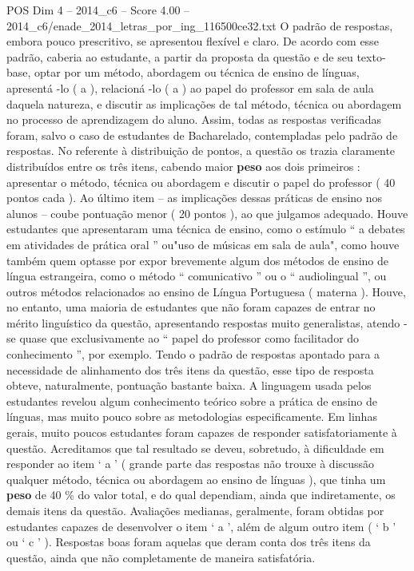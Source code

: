\begin{textsample}{POS Dim 4 – 2014\_c6 – Score 4.00 – 2014\_c6/enade\_2014\_letras\_por\_ing\_116500ce32.txt}
O padrão de respostas, embora pouco prescritivo, se apresentou flexível e claro.
De acordo com esse padrão, caberia ao estudante, a partir da proposta da questão e de seu texto-base, optar por um método, abordagem ou técnica de ensino de línguas, apresentá -lo ( a ), relacioná -lo ( a ) ao papel do professor em sala de aula daquela natureza, e discutir as implicações de tal método, técnica ou abordagem no processo de aprendizagem do aluno.
Assim, todas as respostas verificadas foram, salvo o caso de estudantes de Bacharelado, contempladas pelo padrão de respostas.
No referente à distribuição de pontos, a questão os trazia claramente distribuídos entre os três itens, cabendo maior \textbf{peso} aos dois primeiros : apresentar o método, técnica ou abordagem e discutir o papel do professor ( 40 pontos cada ).
Ao último item – as implicações dessas práticas de ensino nos alunos – coube pontuação menor ( 20 pontos ), ao que julgamos adequado.
Houve estudantes que apresentaram uma técnica de ensino, como o estímulo “ a debates em atividades de prática oral ” ou"uso de músicas em sala de aula", como houve também quem optasse por expor brevemente algum dos métodos de ensino de língua estrangeira, como o método “ comunicativo ” ou o “ audiolingual ”, ou outros métodos relacionados ao ensino de Língua Portuguesa ( materna ).
Houve, no entanto, uma maioria de estudantes que não foram capazes de entrar no mérito linguístico da questão, apresentando respostas muito generalistas, atendo -se quase que exclusivamente ao “ papel do professor como facilitador do conhecimento ”, por exemplo.
Tendo o padrão de respostas apontado para a necessidade de alinhamento dos três itens da questão, esse tipo de resposta obteve, naturalmente, pontuação bastante baixa.
A linguagem usada pelos estudantes revelou algum conhecimento teórico sobre a prática de ensino de línguas, mas muito pouco sobre as metodologias especificamente.
Em linhas gerais, muito poucos estudantes foram capazes de responder satisfatoriamente à questão.
Acreditamos que tal resultado se deveu, sobretudo, à dificuldade em responder ao item ‘ a ’ ( grande parte das respostas não trouxe à discussão qualquer método, técnica ou abordagem ao ensino de línguas ), que tinha um \textbf{peso} de 40 \% do valor total, e do qual dependiam, ainda que indiretamente, os demais itens da questão.
Avaliações medianas, geralmente, foram obtidas por estudantes capazes de desenvolver o item ‘ a ’, além de algum outro item ( ‘ b ’ ou ‘ c ’ ).
Respostas boas foram aquelas que deram conta dos três itens da questão, ainda que não completamente de maneira satisfatória.

\end{textsample}
